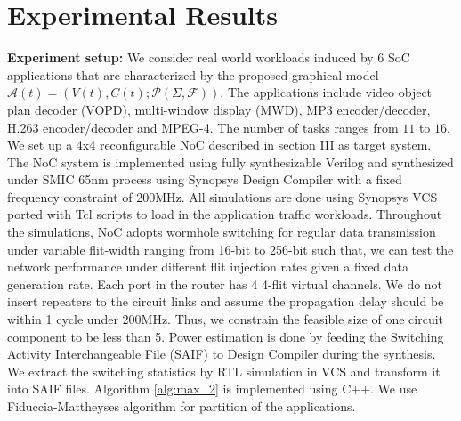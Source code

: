 {{\section{Experimental Results}
\noindent\textbf{Experiment setup:} We consider real world workloads induced by 6 SoC applications that are characterized by the proposed graphical model $\mathcal A(t)=(V(t),C(t);\mathcal P(\Sigma,\mathcal F))$. The applications include video object plan decoder (VOPD), multi-window display (MWD), MP3 encoder/decoder, H.263 encoder/decoder and MPEG-4. The number of tasks ranges from $11$ to $16$. We set up a 4x4 reconfigurable NoC described in section III as target system. The NoC system is implemented using fully synthesizable Verilog and synthesized under SMIC 65nm process using Synopsys Design Compiler with a fixed frequency constraint of 200MHz. All simulations are done using Synopsys VCS ported with Tcl scripts to load in the application traffic workloads. Throughout the simulations, NoC adopts wormhole switching for regular data transmission under variable flit-width ranging from 16-bit to 256-bit such that,  we can test the network performance under different flit injection rates given a fixed data generation rate. Each port in the router has 4 4-flit virtual channels.  We do not insert repeaters to the circuit links and assume the propagation delay should be within 1 cycle under 200MHz. Thus, we constrain the feasible size of one circuit component to be less than 5. Power estimation is done by feeding the Switching Activity Interchangeable File (SAIF) to Design Compiler during the synthesis.  We extract the switching statistics by RTL simulation in VCS and transform it into SAIF files. Algorithm \ref{alg:max_2} is implemented using C++. We use Fiduccia-Mattheyses algorithm for partition of the applications. 

}}
